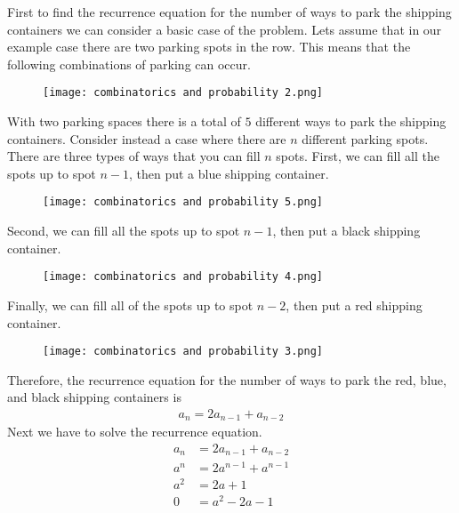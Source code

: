 \documentclass[12pt]{article}
\begin{document}
\begin{addmargin}[1em]{1em}
    First to find the recurrence equation for the number of ways to park the shipping containers we can consider a basic case of the problem. Lets assume that in our example case there are two parking spots in the row. This means that the following combinations of parking can occur.\\
    \begin{figure}[H] 
        \centering
        \texttt{[image: combinatorics and probability 2.png]}
        \label{fig:enter-label}
    \end{figure}
    \noindent With two parking spaces there is a total of $5$ different ways to park the shipping containers. Consider instead a case where there are $n$ different parking spots. There are three types of ways that you can fill $n$ spots. First, we can fill all the spots up to spot $n-1$, then put a blue shipping container.
    \begin{figure}[H]
        \centering
        \texttt{[image: combinatorics and probability 5.png]}
        \label{fig:enter-label}
    \end{figure}
    \noindent Second, we can fill all the spots up to spot $n-1$, then put a black shipping container.
    \begin{figure}[H]
        \centering
        \texttt{[image: combinatorics and probability 4.png]}
        \label{fig:enter-label}
    \end{figure}
    \noindent Finally, we can fill all of the spots up to spot $n-2$, then put a red shipping container.
    \begin{figure}[H]
        \centering
        \texttt{[image: combinatorics and probability 3.png]}
        \label{fig:enter-label}
    \end{figure}
    \noindent  Therefore, the recurrence equation for the number of ways to park the red, blue, and black shipping containers is 
    \begin{align*}
        a_n = 2a_{n-1} + a_{n-2}
    \end{align*}
    Next we have to solve the recurrence equation.
    \begin{align*}
        a_n &= 2a_{n-1} + a_{n-2}\\
        a^n &= 2a^{n-1} + a^{n-1}\\
        a^2 &= 2a + 1\\
        0 &= a^2 -2a -1
    \end{align*}

\end{addmargin}
\end{document}
